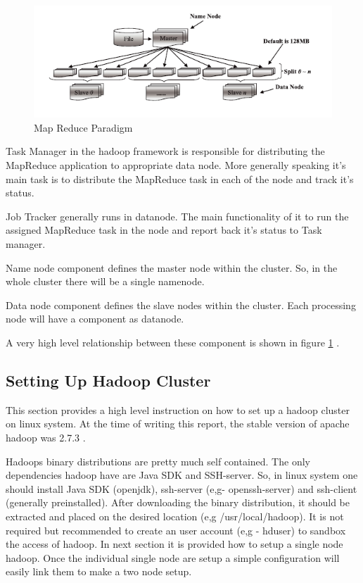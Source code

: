 \documentclass{article}
\begin{document}
\begin{figure}[h]
	\centering
	\includegraphics[width=\textwidth]{hadoop-hdfs}
	\caption{Map Reduce Paradigm}
	\label{fig:hdfs}
\end{figure}

Task Manager in the hadoop framework is responsible for distributing the MapReduce application to appropriate data node. More generally speaking it’s main task is to distribute the MapReduce task in each of the node and track it’s status.

Job Tracker generally runs in datanode. The main functionality of it to run the assigned MapReduce task in the node and report back it’s status to Task manager.

Name node component defines the master node within the cluster. So, in the whole cluster there will be a single namenode.

Data node component defines the slave nodes within the cluster. Each processing node will have a component as datanode.

A very high level relationship between these component is shown in figure \ref{fig:hdfs} \cite{c452017}.

\subsection{Setting Up Hadoop Cluster}
This section provides a high level instruction on how to set up a hadoop cluster on linux system. At the time of writing this report, the stable version of apache hadoop was 2.7.3 \cite{hadoopap}.

Hadoops binary distributions are pretty much self contained. The only dependencies hadoop have are Java SDK and SSH-server. So, in linux system one should install Java SDK (openjdk), ssh-server (e,g- openssh-server) and ssh-client (generally preinstalled). After downloading the binary distribution, it should be extracted and placed on the desired location (e,g /usr/local/hadoop). It is not required but recommended to create an user account (e,g - hduser) to sandbox the access of hadoop. In next section it is provided how to setup a single node hadoop. Once the individual single node are setup a simple configuration will easily link them to make a two node setup.
\end{document}
